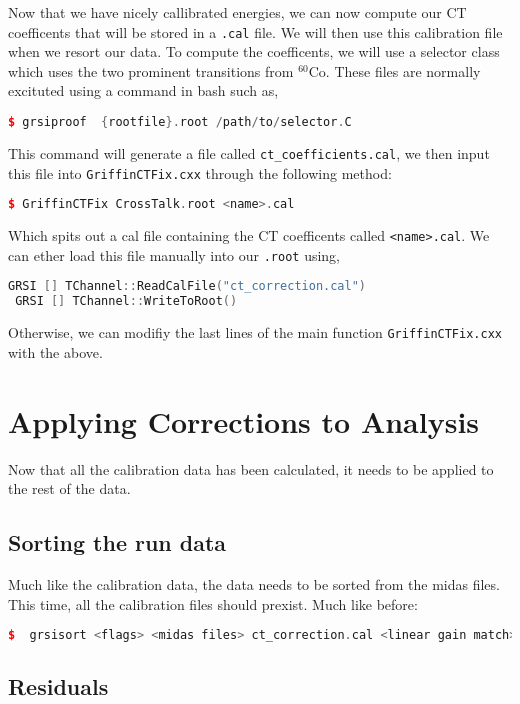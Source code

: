 \documentclass[10pt]{article} %
\begin{document}
Now that we have nicely callibrated energies, we can now compute our CT coefficents that will be stored in a \texttt{.cal} file.
We will then use this calibration file when we resort our data.
To compute the coefficents, we will use a selector class which uses the two prominent transitions from ${^{60}}$Co.
These files are normally excituted using a command in bash such as,
\begin{lstlisting}[language=c++]
 $ grsiproof  {rootfile}.root /path/to/selector.C
 \end{lstlisting}
This command will generate a file called  \lstinline{ct_coefficients.cal}, we then input this file into \texttt{GriffinCTFix.cxx} through the following method:
\begin{lstlisting}[language=c++]
 $ GriffinCTFix CrossTalk.root <name>.cal
  \end{lstlisting}
Which spits out a cal file containing the CT coefficents called \texttt{<name>.cal}. We can ether load this file manually into our \texttt{.root} using,
\begin{lstlisting}[language=c++]
 GRSI [] TChannel::ReadCalFile("ct_correction.cal")
 GRSI [] TChannel::WriteToRoot()
\end{lstlisting}
Otherwise, we can modifiy the last lines of the main function \texttt{GriffinCTFix.cxx} with the above.

\section{Applying Corrections to Analysis}

Now that all the calibration data has been calculated, it needs to be applied to the rest of the data.

\subsection{Sorting the run data}

Much like the calibration data, the data needs to be sorted from the midas files.
This time, all the calibration files should prexist.
Much like before:

\begin{lstlisting}[language=c++]
$  grsisort <flags> <midas files> ct_correction.cal <linear gain match>.cal
\end{lstlisting}


\subsection{Residuals}
\end{document}
